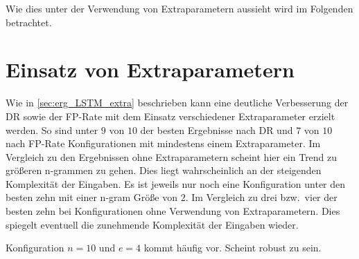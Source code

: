 Wie dies unter der Verwendung von Extraparametern aussieht wird im Folgenden betrachtet.

\section{Einsatz von Extraparametern}

Wie in \autoref{sec:erg_LSTM_extra} beschrieben kann eine deutliche Verbesserung der \ac{DR} sowie  der \ac{FP}-Rate mit dem Einsatz verschiedener Extraparameter erzielt werden.
So sind unter $9$ von $10$ der besten Ergebnisse nach \ac{DR} und $7$ von $10$ nach \ac{FP}-Rate Konfigurationen mit mindestens einem Extraparameter.
Im Vergleich zu den Ergebnissen ohne Extraparametern scheint hier ein Trend zu größeren n-grammen zu gehen.
Dies liegt wahrscheinlich an der steigenden Komplexität der Eingaben.
Es ist jeweils nur noch eine Konfiguration unter den besten zehn mit einer n-gram Größe von $2$.
Im Vergleich zu drei bzw.\ vier der besten zehn bei Konfigurationen ohne Verwendung von Extraparametern.
Dies spiegelt eventuell die zunehmende Komplexität der Eingaben wieder.  

Konfiguration $n=10$ und $e=4$ kommt häufig vor.
Scheint robust zu sein. 

